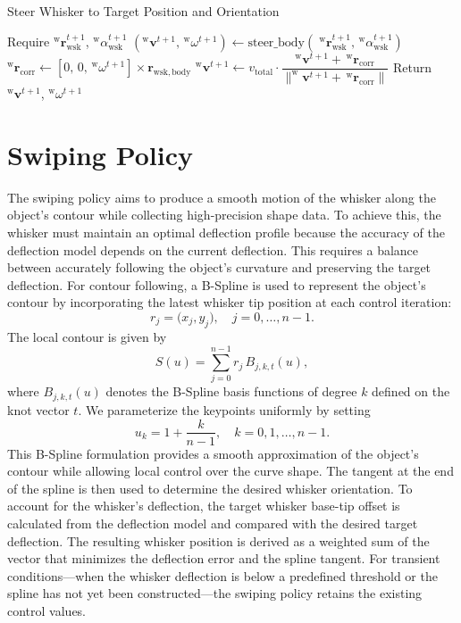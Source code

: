 \begin{algorithm}[htb]
    \caption{Steer Whisker to Target Position and Orientation}
    \begin{algorithmic}
        \State Require \(^{\mathrm{w}}\boldsymbol{r}_{\mathrm{wsk}}^{t+1}\), \(^{\mathrm{w}}\alpha_{\mathrm{wsk}}^{t+1}\)
        \State \((^{\mathrm{w}}\boldsymbol{v}^{t+1},\, ^{\mathrm{w}}\omega^{t+1}) \gets \mathrm{steer\_body}(\;^{\mathrm{w}}\boldsymbol{r}_{\mathrm{wsk}}^{t+1},\, ^{\mathrm{w}}\alpha_{\mathrm{wsk}}^{t+1})\)
        \State \(^{\mathrm{w}}\boldsymbol{r}_{\mathrm{corr}} \gets [0,\,0,\,^{\mathrm{w}}\omega^{t+1}] \times \boldsymbol{r}_{\mathrm{wsk, body}}\) 
        \State \(^{\mathrm{w}}\boldsymbol{v}^{t+1} \gets v_{\mathrm{total}} \cdot \dfrac{^{\mathrm{w}}\boldsymbol{v}^{t+1} + \,^{\mathrm{w}}\boldsymbol{r}_{\mathrm{corr}}}{\|^{\mathrm{w}}\boldsymbol{v}^{t+1} + \,^{\mathrm{w}}\boldsymbol{r}_{\mathrm{corr}}\|}\)
        \State Return \(^{\mathrm{w}}\boldsymbol{v}^{t+1}\), \(^{\mathrm{w}}\omega^{t+1}\)
    \end{algorithmic}
    \label{alg:steer_whisker}
\end{algorithm}


\section{Swiping Policy}

The swiping policy aims to produce a smooth motion of the whisker along the object's contour while collecting high-precision shape data.
To achieve this, the whisker must maintain an optimal deflection profile because the accuracy of the deflection model depends on the current deflection.
This requires a balance between accurately following the object's curvature and preserving the target deflection.
For contour following, a B-Spline is used to represent the object's contour by incorporating the latest whisker tip position at each control iteration:
\[
    r_j = \bigl(x_j,y_j\bigr), \quad j=0,\dots,n-1.
\]
The local contour is given by
\[
    S(u) = \sum_{j=0}^{n-1} r_j \, B_{j,k,t}(u),
\]
where \(B_{j,k,t}(u)\) denotes the B-Spline basis functions of degree \(k\) defined on the knot vector \(t\).
We parameterize the keypoints uniformly by setting
\[
    u_k = 1 + \frac{k}{n-1}, \quad k=0,1,\dots,n-1.
\]
This B-Spline formulation provides a smooth approximation of the object's contour while allowing local control over the curve shape.
The tangent at the end of the spline is then used to determine the desired whisker orientation.
To account for the whisker's deflection, the target whisker base-tip offset is calculated from the deflection model and compared with the desired target deflection.
The resulting whisker position is derived as a weighted sum of the vector that minimizes the deflection error and the spline tangent.
For transient conditions—when the whisker deflection is below a predefined threshold or the spline has not yet been constructed—the swiping policy retains the existing control values.

